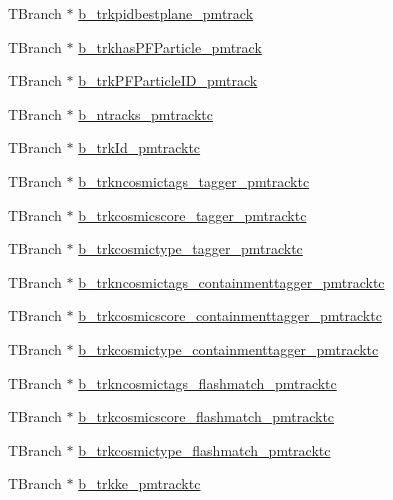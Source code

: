 \begin{DoxyCompactItemize}
\item 
T\-Branch $\ast$ \hyperlink{classanatree_ae4dd7a75e9b3054ad5d20421d4c82a5a}{b\-\_\-trkpidbestplane\-\_\-pmtrack}
\item 
T\-Branch $\ast$ \hyperlink{classanatree_a8a334c6eb01caec5a05d3e0a8b8f614c}{b\-\_\-trkhas\-P\-F\-Particle\-\_\-pmtrack}
\item 
T\-Branch $\ast$ \hyperlink{classanatree_a005ca19c48ded398b5954cdb22a51fd5}{b\-\_\-trk\-P\-F\-Particle\-I\-D\-\_\-pmtrack}
\item 
T\-Branch $\ast$ \hyperlink{classanatree_a8eca92e362ccabbecdeeb378893b3454}{b\-\_\-ntracks\-\_\-pmtracktc}
\item 
T\-Branch $\ast$ \hyperlink{classanatree_a57123eac106f498e4e9e38460b8417d9}{b\-\_\-trk\-Id\-\_\-pmtracktc}
\item 
T\-Branch $\ast$ \hyperlink{classanatree_ae4722fdeec62aee3d07a17e9f16aa256}{b\-\_\-trkncosmictags\-\_\-tagger\-\_\-pmtracktc}
\item 
T\-Branch $\ast$ \hyperlink{classanatree_ab39e90eb53f753449c0e792f647889e8}{b\-\_\-trkcosmicscore\-\_\-tagger\-\_\-pmtracktc}
\item 
T\-Branch $\ast$ \hyperlink{classanatree_a59d1660a9033d63bb26c5678f8520463}{b\-\_\-trkcosmictype\-\_\-tagger\-\_\-pmtracktc}
\item 
T\-Branch $\ast$ \hyperlink{classanatree_a2db1a9487f1fc49cd291523a7a4253d8}{b\-\_\-trkncosmictags\-\_\-containmenttagger\-\_\-pmtracktc}
\item 
T\-Branch $\ast$ \hyperlink{classanatree_ac3973da95c7700d038d03e167f5b3a45}{b\-\_\-trkcosmicscore\-\_\-containmenttagger\-\_\-pmtracktc}
\item 
T\-Branch $\ast$ \hyperlink{classanatree_aecfd7b8915425dfa69326efbe4a71037}{b\-\_\-trkcosmictype\-\_\-containmenttagger\-\_\-pmtracktc}
\item 
T\-Branch $\ast$ \hyperlink{classanatree_afd86722fb60b2457a725531f6ffb7d3e}{b\-\_\-trkncosmictags\-\_\-flashmatch\-\_\-pmtracktc}
\item 
T\-Branch $\ast$ \hyperlink{classanatree_aee0d6ae30f16a0c87abc5667b3105853}{b\-\_\-trkcosmicscore\-\_\-flashmatch\-\_\-pmtracktc}
\item 
T\-Branch $\ast$ \hyperlink{classanatree_a07f8f80d4f4af81e0ee35a2980edc14b}{b\-\_\-trkcosmictype\-\_\-flashmatch\-\_\-pmtracktc}
\item 
T\-Branch $\ast$ \hyperlink{classanatree_a24d7d9999c145731a75bc9d9b44ba992}{b\-\_\-trkke\-\_\-pmtracktc}
\item 

\end{DoxyCompactItemize}
